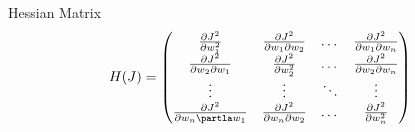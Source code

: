 \documentclass[11pt,a4paper]{article}
\begin{document}
\begin{definition}{Hessian Matrix}
  \[ H(J)=\begin{pmatrix}\frac{\partial J^2}{\partial w_1^2}&\frac{\partial J^2}{\partial w_1\partial w_2}&\dots&\frac{\partial J^2}{\partial w_1\partial w_n}\\\frac{\partial J^2}{\partial w_2\partial w_1}&\frac{\partial J^2}{\partial w_2^2}&\dots&\frac{\partial J^2}{\partial w_2\partial w_n}\\\vdots&\vdots&\ddots&\vdots\\\frac{\partial J^2}{\partial w_n\partla w_1}&\frac{\partial J^2}{\partial w_n\partial w_2}&\dots&\frac{\partial J^2}{\partial w_n^2}\end{pmatrix}\]
\end{definition}
\end{document}
